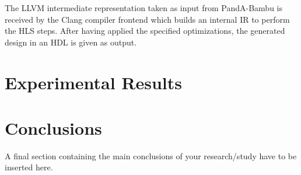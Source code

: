 \documentclass[11pt,a4paper,twocolumn]{article}
\begin{document}
The LLVM intermediate representation taken as input from PandA-Bambu is received by the Clang compiler frontend which builds an internal IR to perform the HLS steps.
After having applied the specified optimizations, the generated design in an HDL is given as output.


\section{Experimental Results}
\label{sec:experimental-results}%

\section{Conclusions}
A final section containing the main conclusions of your research/study have to be inserted here.


\end{document}
